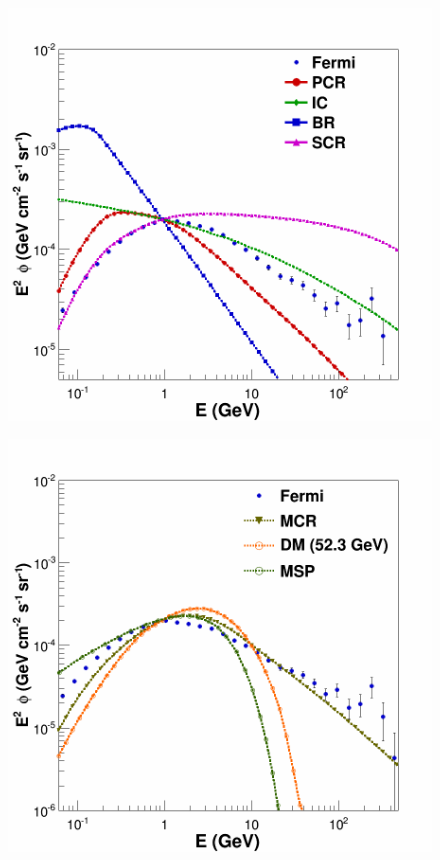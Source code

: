 \begin{figure}[h]
  \centering
  \begin{minipage}[h]{0.45\textwidth}
  	\centering
	\includegraphics[width=1\linewidth]{pic/method/norm_bkg_comp.png}
 	\label{fig:norm_bkg_component}
  \end{minipage}
  \hfill
  \begin{minipage}[h]{0.45\textwidth}
	  \centering
	  \includegraphics[width=1\linewidth]{pic/method/norm_excess_comp.png}

\end{minipage}
\end{figure}
